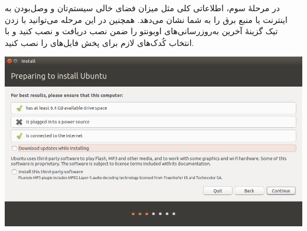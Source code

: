 در مرحلهٔ سوم، اطلاعاتی کلی مثل میزان فضای خالی سیستم‌تان و وصل‌بودن به اینترنت یا منبع برق را به شما نشان می‌دهد. همچنین در این مرحله می‌توانید با زدن تیک گزینهٔ  آخرین به‌روزرسانی‌های اوبونتو را ضمن نصب دریافت و نصب کنید و با انتخاب  کُدک‌های لازم برای پخش فایل‌های  را نصب کنید.

\begin{center}
\includegraphics[scale=0.5]{pics/5.png}\\
\end{center}

